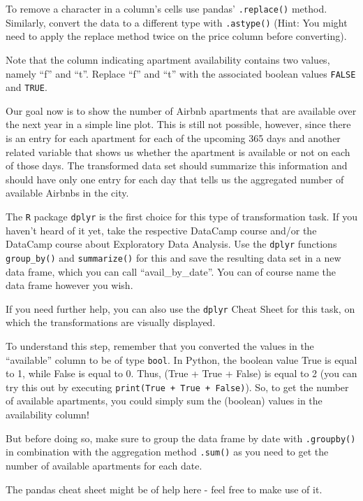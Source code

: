 \documentclass[
  11pt,
]{article}
\newenvironment{tips}[1]
  {
  \begin{itemize}
  \footnotesize
  \renewcommand{\labelitemi}{
    \raisebox{-.7\height}[0pt][0pt]{
      {\setkeys{Gin}{width=3em,keepaspectratio}
        \texttt{[image: images/\#1.png]}}
    }
  }
  \setlength{\fboxsep}{1em}
  \begin{rbox}
  \item
  }
  {
  \end{rbox}
  \end{itemize}
  }
\newenvironment{tipsp}[1]
  {
  \begin{itemize}
  \footnotesize
  \renewcommand{\labelitemi}{
    \raisebox{-.7\height}[0pt][0pt]{
      {\setkeys{Gin}{width=3em,keepaspectratio}
        \texttt{[image: images/\#1.png]}}
    }
  }
  \setlength{\fboxsep}{1em}
  \begin{pbox}
  \item
  }
  {
  \end{pbox}
  \end{itemize}
  }
\begin{document}
\begin{tipsp}p
To remove a character in a column's cells use pandas' \texttt{.replace()} method. Similarly, convert the data to a different type with \texttt{.astype()} (Hint: You might need to apply the replace method twice on the price column before converting).

Note that the column indicating apartment availability contains two values, namely ``f'' and ``t''. Replace ``f'' and ``t'' with the associated boolean values \texttt{FALSE} and \texttt{TRUE}.

\end{tipsp}

Our goal now is to show the number of Airbnb apartments that are available over the next year in a simple line plot. This is still not possible, however, since there is an entry for each apartment for each of the upcoming 365 days and another related variable that shows us whether the apartment is available or not on each of those days. The transformed data set should summarize this information and should have only one entry for each day that tells us the aggregated number of available Airbnbs in the city.

\begin{tips}r
The \texttt{R} package \texttt{dplyr} is the first choice for this type of transformation task. If you haven't heard of it yet, take the respective DataCamp course and/or the DataCamp course about Exploratory Data Analysis. Use the \texttt{dplyr} functions \texttt{group\_by()} and \texttt{summarize()} for this and save the resulting data set in a new data frame, which you can call ``avail\_by\_date''. You can of course name the data frame however you wish.

If you need further help, you can also use the \texttt{dplyr} Cheat Sheet for this task, on which the transformations are visually displayed.

\end{tips}

\begin{tipsp}p
To understand this step, remember that you converted the values in the ``available'' column to be of type \texttt{bool}. In Python, the boolean value True is equal to 1, while False is equal to 0. Thus, (True + True + False) is equal to 2 (you can try this out by executing \texttt{print(True\ +\ True\ +\ False)}). So, to get the number of available apartments, you could simply sum the (boolean) values in the availability column!

But before doing so, make sure to group the data frame by date with \texttt{.groupby()} in combination with the aggregation method \texttt{.sum()} as you need to get the number of available apartments for each date.

The pandas cheat sheet might be of help here - feel free to make use of it.

\end{tipsp}
\end{document}
